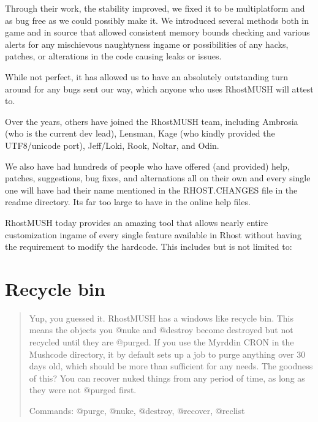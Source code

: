 \documentclass[letterpaper,10pt,english]{sphinxmanual}
\begin{document}
\sphinxAtStartPar
Through their work, the stability improved, we fixed it to be multi\sphinxhyphen{}platform
and as bug free as we could possibly make it.  We introduced several methods both
in game and in source that allowed consistent memory bounds checking and
various alerts for any mischievous naughtyness in\sphinxhyphen{}game or possibilities of any
hacks, patches, or alterations in the code causing leaks or issues.

\sphinxAtStartPar
While not perfect, it has allowed us to have an absolutely outstanding
turn around for any bugs sent our way, which anyone who uses RhostMUSH will
attest to.

\sphinxAtStartPar
Over the years, others have joined the RhostMUSH team, including Ambrosia
(who is the current dev lead), Lensman, Kage (who kindly provided the
UTF8/unicode port), Jeff/Loki, Rook, Noltar, and Odin.

\sphinxAtStartPar
We also have had hundreds of people who have offered (and provided) help,
patches, suggestions, bug fixes, and alternations all on their own and
every single one will have had their name mentioned in the RHOST.CHANGES
file in the readme directory.  It\textquotesingle{}s far too large to have in the online
help files.

\sphinxAtStartPar
RhostMUSH today provides an amazing tool that allows nearly entire
customization in\sphinxhyphen{}game of every single feature available in Rhost without
having the requirement to modify the hardcode.  This includes but is
not limited to:


\section{Recycle bin}
\label{\detokenize{features:recycle-bin}}\begin{quote}

\sphinxAtStartPar
Yup, you guessed it.  RhostMUSH has a windows like recycle bin.
This means the objects you @nuke and @destroy become \textquotesingle{}destroyed\textquotesingle{}
but not recycled until they are @purged.  If you use the Myrddin
CRON in the Mushcode directory, it by default sets up a job
to purge anything over 30 days old, which should be more than
sufficient for any needs.  The goodness of this?  You can recover
nuked things from any period of time, as long as they were not
@purged first.

\sphinxAtStartPar
Commands: @purge, @nuke, @destroy, @recover, @reclist
\end{quote}
\end{document}
